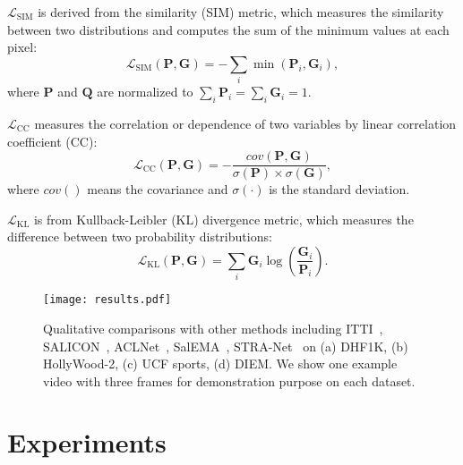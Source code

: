 \documentclass[review]{elsarticle}
\begin{document}
$\mathcal{L}_{\mathrm{SIM}}$ is derived from the similarity (SIM) metric, which measures the similarity between two distributions and computes the sum of the minimum values at each pixel:
\begin{equation}
\label{eq:sim}
\mathcal{L}_{\mathrm{SIM}}(\bm{P},\bm{G}) = - \sum\limits_{i} \min(\bm{P}_{i}, \bm{G}_{i}),
\end{equation}
where $\bm{P}$ and $\bm{Q}$ are normalized to $\sum\limits_{i} \bm{P}_{i} = \sum\limits_{i} \bm{G}_{i} = 1$.

$\mathcal{L}_{\mathrm{CC}}$  measures the correlation or dependence of two variables by linear correlation coefficient (CC):
\begin{equation}
\label{eq:cc}
\mathcal{L}_{\mathrm{CC}}(\bm{P},\bm{G}) = - \frac{cov(\bm{P},\bm{G})}{\sigma (\bm{P}) \times \sigma (\bm{G})},
\end{equation}
where $cov()$ means the covariance and $\sigma (\cdot)$ is the standard deviation.

$\mathcal{L}_{\mathrm{KL}}$ is from Kullback-Leibler (KL) divergence metric, which measures the difference between two probability distributions:
\begin{equation}
\label{eq:kl}
\mathcal{L}_{\mathrm{KL}}(\bm{P},\bm{G}) = \sum\limits_{i} \bm{G}_{i} \log(\frac{\bm{G}_{i}}{\bm{P}_{i}}).
\end{equation}



\begin{figure*}[t]
\centering
\texttt{[image: results.pdf]}
\caption{Qualitative comparisons with other methods including ITTI~\cite{itti1998model}, SALICON~\cite{huang2015salicon}, ACLNet~\cite{wang2018revisiting}, SalEMA~\cite{linardos2019simple}, STRA-Net~\cite{lai2019video} on (a) DHF1K, (b) HollyWood-2, (c) UCF sports, (d) DIEM. We show one example video with three frames for demonstration purpose on each dataset.}
\label{results}
\end{figure*}


\section{Experiments}
\end{document}
